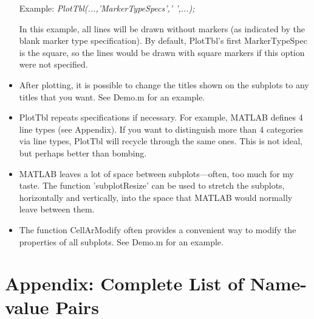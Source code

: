 \documentclass{article}
\newcommand{\example}[1]{Example: {\it #1}}
\begin{document}
\begin{itemize}
\example{PlotTbl(...,'MarkerTypeSpecs',' ',...);} 

In this example, all lines will be drawn without markers (as indicated by the blank marker type specification).
By default, PlotTbl's first MarkerTypeSpec is the square, so the lines would be drawn with square
markers if this option were not specified.

\item After plotting, it is possible to change the titles shown on the subplots to any titles that
you want.  See Demo.m for an example.

\item PlotTbl repeats specifications if necessary.  For example, MATLAB defines 4 line types (see Appendix).
If you want to distinguish more than 4 categories via line types, PlotTbl will recycle through the same ones.
This is not ideal, but perhaps better than bombing.

\item MATLAB leaves a lot of space between subplots---often, too much for my taste.
The function 'subplotResize' can be used to stretch the subplots, horizontally and vertically,
into the space that MATLAB would normally leave between them.

\item The function CellArModify often provides a convenient way to modify the properties of
all subplots.  See Demo.m for an example.

\end{itemize}

\appendix


\section{Appendix: Complete List of Name-value Pairs}
\end{document}
